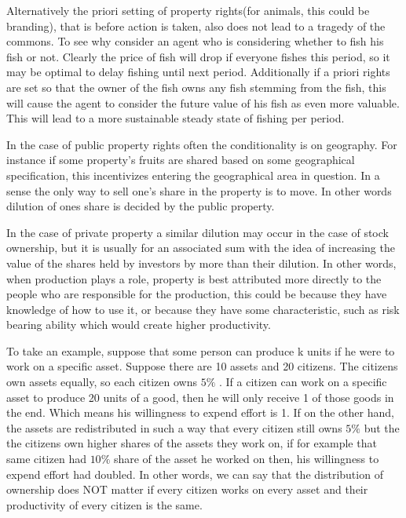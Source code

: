 \documentclass[12pt]{article}
\numberwithin{equation}{section}
\begin{document}
Alternatively the priori setting of property rights(for animals, this could be branding), that is before action is taken, also does not lead to a tragedy of the commons. To see why consider an agent who is considering whether to fish his fish or not. Clearly the price of fish will drop if everyone fishes this period, so it may be optimal to delay fishing until next period. Additionally if a priori rights are set so that the owner of the fish owns any fish stemming from the fish, this will cause the agent to consider the future value of his fish as even more valuable. This will lead to a more sustainable steady state of fishing per period. 

In the case of public property rights often the conditionality is on geography. For instance if some property's fruits are shared based on some geographical specification, this incentivizes entering the geographical area in question. In a sense the only way to sell one's share in the property is to move. In other words dilution of ones share is decided by the public property. 

In the case of private property a similar dilution may occur in the case of stock ownership, but it is usually for an associated sum with the idea of increasing the value of the shares held by investors by more than their dilution. In other words, when production plays a role, property is best attributed more directly to the people who are responsible for the production, this could be because they have knowledge of how to use it, or because they have some characteristic, such as risk bearing ability which would create higher productivity. 

To take an example, suppose that some person can produce k units if he were to work on a specific asset. Suppose there are 10 assets and 20 citizens. The citizens own assets equally, so each citizen owns $5 \%$ . If a citizen can work on a specific asset to produce 20 units of a good, then he will only receive 1 of those goods in the end. Which means his willingness to expend effort is 1. If on the other hand, the assets are redistributed in such a way that every citizen still owns $5 \%$ but the the citizens own higher shares of the assets they work on, if for example that same citizen had $10\%$ share of the asset he worked on then, his willingness to expend effort had doubled. In other words, we can say that the distribution of ownership does NOT matter if every citizen works on every asset and their productivity of every citizen is the same. 
\end{document}
